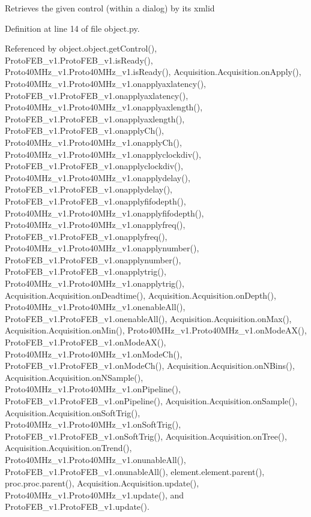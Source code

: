 \begin{DoxyVerb}Retrieves the given control (within a dialog) by its xmlid\end{DoxyVerb}
 

Definition at line 14 of file object.\+py.



Referenced by object.\+object.\+get\+Control(), Proto\+F\+E\+B\+\_\+v1.\+Proto\+F\+E\+B\+\_\+v1.\+is\+Ready(), Proto40\+M\+Hz\+\_\+v1.\+Proto40\+M\+Hz\+\_\+v1.\+is\+Ready(), Acquisition.\+Acquisition.\+on\+Apply(), Proto40\+M\+Hz\+\_\+v1.\+Proto40\+M\+Hz\+\_\+v1.\+onapplyaxlatency(), Proto\+F\+E\+B\+\_\+v1.\+Proto\+F\+E\+B\+\_\+v1.\+onapplyaxlatency(), Proto40\+M\+Hz\+\_\+v1.\+Proto40\+M\+Hz\+\_\+v1.\+onapplyaxlength(), Proto\+F\+E\+B\+\_\+v1.\+Proto\+F\+E\+B\+\_\+v1.\+onapplyaxlength(), Proto\+F\+E\+B\+\_\+v1.\+Proto\+F\+E\+B\+\_\+v1.\+onapply\+Ch(), Proto40\+M\+Hz\+\_\+v1.\+Proto40\+M\+Hz\+\_\+v1.\+onapply\+Ch(), Proto40\+M\+Hz\+\_\+v1.\+Proto40\+M\+Hz\+\_\+v1.\+onapplyclockdiv(), Proto\+F\+E\+B\+\_\+v1.\+Proto\+F\+E\+B\+\_\+v1.\+onapplyclockdiv(), Proto40\+M\+Hz\+\_\+v1.\+Proto40\+M\+Hz\+\_\+v1.\+onapplydelay(), Proto\+F\+E\+B\+\_\+v1.\+Proto\+F\+E\+B\+\_\+v1.\+onapplydelay(), Proto\+F\+E\+B\+\_\+v1.\+Proto\+F\+E\+B\+\_\+v1.\+onapplyfifodepth(), Proto40\+M\+Hz\+\_\+v1.\+Proto40\+M\+Hz\+\_\+v1.\+onapplyfifodepth(), Proto40\+M\+Hz\+\_\+v1.\+Proto40\+M\+Hz\+\_\+v1.\+onapplyfreq(), Proto\+F\+E\+B\+\_\+v1.\+Proto\+F\+E\+B\+\_\+v1.\+onapplyfreq(), Proto40\+M\+Hz\+\_\+v1.\+Proto40\+M\+Hz\+\_\+v1.\+onapplynumber(), Proto\+F\+E\+B\+\_\+v1.\+Proto\+F\+E\+B\+\_\+v1.\+onapplynumber(), Proto\+F\+E\+B\+\_\+v1.\+Proto\+F\+E\+B\+\_\+v1.\+onapplytrig(), Proto40\+M\+Hz\+\_\+v1.\+Proto40\+M\+Hz\+\_\+v1.\+onapplytrig(), Acquisition.\+Acquisition.\+on\+Deadtime(), Acquisition.\+Acquisition.\+on\+Depth(), Proto40\+M\+Hz\+\_\+v1.\+Proto40\+M\+Hz\+\_\+v1.\+onenable\+All(), Proto\+F\+E\+B\+\_\+v1.\+Proto\+F\+E\+B\+\_\+v1.\+onenable\+All(), Acquisition.\+Acquisition.\+on\+Max(), Acquisition.\+Acquisition.\+on\+Min(), Proto40\+M\+Hz\+\_\+v1.\+Proto40\+M\+Hz\+\_\+v1.\+on\+Mode\+A\+X(), Proto\+F\+E\+B\+\_\+v1.\+Proto\+F\+E\+B\+\_\+v1.\+on\+Mode\+A\+X(), Proto40\+M\+Hz\+\_\+v1.\+Proto40\+M\+Hz\+\_\+v1.\+on\+Mode\+Ch(), Proto\+F\+E\+B\+\_\+v1.\+Proto\+F\+E\+B\+\_\+v1.\+on\+Mode\+Ch(), Acquisition.\+Acquisition.\+on\+N\+Bins(), Acquisition.\+Acquisition.\+on\+N\+Sample(), Proto40\+M\+Hz\+\_\+v1.\+Proto40\+M\+Hz\+\_\+v1.\+on\+Pipeline(), Proto\+F\+E\+B\+\_\+v1.\+Proto\+F\+E\+B\+\_\+v1.\+on\+Pipeline(), Acquisition.\+Acquisition.\+on\+Sample(), Acquisition.\+Acquisition.\+on\+Soft\+Trig(), Proto40\+M\+Hz\+\_\+v1.\+Proto40\+M\+Hz\+\_\+v1.\+on\+Soft\+Trig(), Proto\+F\+E\+B\+\_\+v1.\+Proto\+F\+E\+B\+\_\+v1.\+on\+Soft\+Trig(), Acquisition.\+Acquisition.\+on\+Tree(), Acquisition.\+Acquisition.\+on\+Trend(), Proto40\+M\+Hz\+\_\+v1.\+Proto40\+M\+Hz\+\_\+v1.\+onunable\+All(), Proto\+F\+E\+B\+\_\+v1.\+Proto\+F\+E\+B\+\_\+v1.\+onunable\+All(), element.\+element.\+parent(), proc.\+proc.\+parent(), Acquisition.\+Acquisition.\+update(), Proto40\+M\+Hz\+\_\+v1.\+Proto40\+M\+Hz\+\_\+v1.\+update(), and Proto\+F\+E\+B\+\_\+v1.\+Proto\+F\+E\+B\+\_\+v1.\+update().


